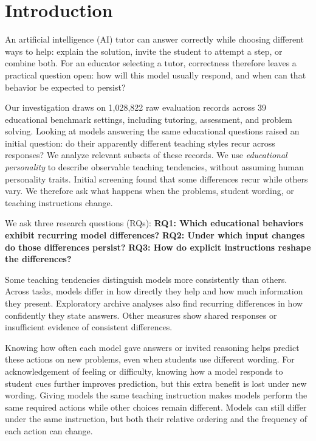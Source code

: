 \section{Introduction}

An artificial intelligence (AI) tutor can answer correctly while choosing different ways to help:
explain the solution, invite the student to attempt a step, or combine both.
For an educator selecting a tutor, correctness therefore leaves a practical
question open: how will this model usually respond, and when can that behavior
be expected to persist?

Our investigation draws on 1,028,822 raw evaluation records across 39 educational
benchmark settings, including tutoring, assessment, and problem solving.
Looking at models answering the same educational questions raised an initial
question: do their apparently different teaching styles recur across responses?
We analyze relevant subsets of these records. We use \emph{educational personality}
to describe observable teaching tendencies, without assuming human personality
traits. Initial screening found that some differences recur while others vary. We
therefore ask what happens when the problems, student wording, or teaching
instructions change.

We ask three research questions (RQs):
\textbf{RQ1: Which educational behaviors exhibit recurring model differences?}
\textbf{RQ2: Under which input changes do those differences persist?}
\textbf{RQ3: How do explicit instructions reshape the differences?}

Some teaching tendencies distinguish models more consistently than others.
Across tasks, models differ in how directly they help and how much information
they present. Exploratory archive analyses also find recurring differences in
how confidently they state answers. Other measures show shared responses or
insufficient evidence of consistent differences.

Knowing how often each model gave answers or invited reasoning helps predict
these actions on new problems, even when students use different wording.
For acknowledgement of feeling or difficulty, knowing how a model responds to
student cues further improves prediction, but this extra benefit is lost under
new wording. Giving models the same teaching instruction makes models perform the same required
actions while other choices remain different. Models can still differ under the same instruction, but both their relative
ordering and the frequency of each action can change.

